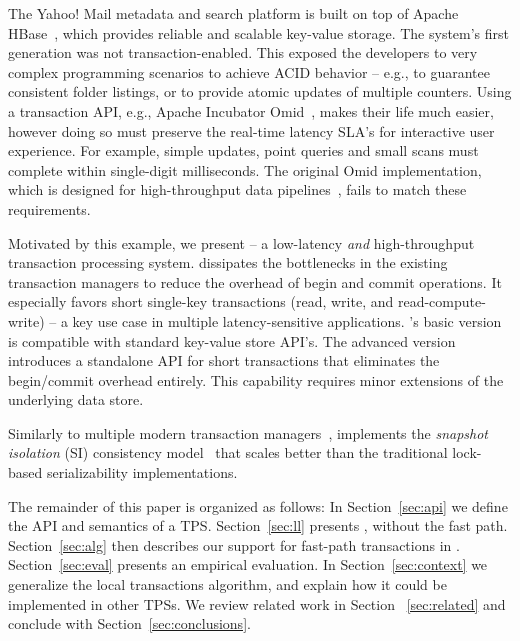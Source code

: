 The Yahoo! Mail metadata and search platform is built on top of Apache HBase~\cite{hbase}, 
which provides reliable and scalable key-value storage. The system's first generation was not 
transaction-enabled. This exposed the developers to very complex programming scenarios 
to achieve ACID behavior -- e.g., to guarantee consistent folder listings, or to provide 
atomic updates of multiple counters. Using a transaction API, e.g.,  
Apache Incubator Omid~\cite{omid}, makes their life much easier, however doing so 
must preserve the real-time latency SLA's for interactive user experience. For example, 
simple updates, point queries and small scans must complete within single-digit milliseconds. 
The original Omid implementation, which is designed for high-throughput data pipelines~\cite{Omid2017}, 
fails to match these requirements. %

Motivated by this example, we present {\sys\/} -- a low-latency {\em and\/} high-throughput 
transaction processing system. {\sys\/} dissipates the bottlenecks in the existing transaction 
managers to reduce the overhead of begin and commit operations. 
It especially favors short single-key transactions (read, write, and read-compute-write) -- 
a key use case in multiple latency-sensitive applications. {\sys}'s basic version is compatible 
with standard key-value store API's. The advanced version introduces a standalone API 
for short transactions that eliminates the begin/commit overhead entirely. This  
capability requires minor extensions of the underlying data store. 
 
Similarly to multiple modern transaction managers~\cite{cockroach,Spanner2012,Percolator2010,Omid2017},
{\sys\/} implements the {\em snapshot isolation} (SI) consistency model~\cite{DBLP:conf/sigmod/BerensonBGMOO95}
that scales better than the traditional lock-based serializability implementations. 

The remainder of this paper is organized as follows:
In Section~\ref{sec:api} we define the  API and semantics of a TPS. 
Section~\ref{sec:ll} presents \sys, without the fast path. 
Section~\ref{sec:alg} then describes our support for fast-path  transactions in \sys.  
Section~\ref{sec:eval} presents an empirical evaluation.
In Section~\ref{sec:context} we generalize the local transactions algorithm, and explain how it could be implemented in 
other TPSs. 
 We review related work in Section ~\ref{sec:related} and conclude with Section~\ref{sec:conclusions}.
